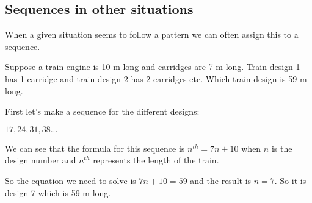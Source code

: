\subsection{Sequences in other situations}
When a given situation seems to follow a pattern we can often assign this to a sequence.

\begin{exmp}
Suppose a train engine is 10 m long and carridges are 7 m long. Train design 1 has 1 carridge and train design 2 has 2 carridges etc. Which train design is 59 m long.

First let's make a sequence for the different designs:

\bigskip

$17, 24, 31, 38...$

\bigskip

We can see that the formula for this sequence is $n^{th}=7n+10$ when $n$ is the design number and $n^{th}$ represents the length of the train.

\bigskip

So the equation we need to solve is $7n+10=59$ and the result is $n=7$.  So it is design 7 which is 59 m long.
\end{exmp}
